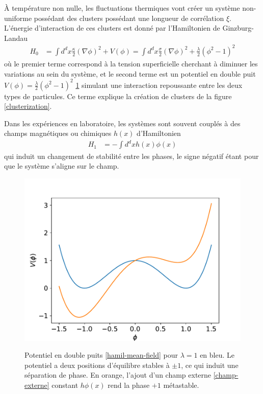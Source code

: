 À température non nulle, les fluctuations thermiques vont créer un système non-uniforme possédant des clusters possédant une longueur de corrélation $\xi$. L'énergie d'interaction de ces clusters est donné par l'Hamiltonien de Ginzburg-Landau\cite[§ 45]{l_landau_physique_1990}
\begin{align}
    H_0 &= \int d^dx \frac{\kappa}{2}(\nabla \phi)^2 + V(\phi) =  \int d^dx \frac{\sigma}{2}(\nabla \phi)^2 + \frac{\lambda}{2}(\phi^2-1)^2
    \label{hamil-mean-field}
\end{align}
où le premier terme correspond à la tension superficielle cherchant à diminuer les variations au sein du système, et le second terme est un potentiel en double puit $V(\phi) = \frac{\lambda}{2}(\phi^2-1)^2$ \ref{double-puits} simulant une interaction repoussante entre les deux types de particules. Ce terme explique la création de clusters de la figure \ref{clusterization}.

Dans les expériences en laboratoire, les systèmes sont souvent couplés à des champs magnétiques ou chimiques $h(x)$ d'Hamiltonien
\begin{align}
    H_1 &= - \int d^dx h(x)\phi(x)
    \label{champ-externe}
\end{align}
qui induit un changement de stabilité entre les phases, le signe négatif étant pour que le système s'aligne sur le champ. 
\begin{figure}
    \centering
    \includegraphics[width=0.5\linewidth]{intro/shift.pdf}
    \label{double-puits}
    \caption{Potentiel en double puits \ref{hamil-mean-field} pour $\lambda = 1$ en bleu. Le potentiel a deux positions d'équilibre stables à $\pm1$, ce qui induit une séparation de phase. En orange, l'ajout d'un champ externe \ref{champ-externe} constant $h \phi(x)$ rend la phase $+1$ métastable.}
\end{figure}

